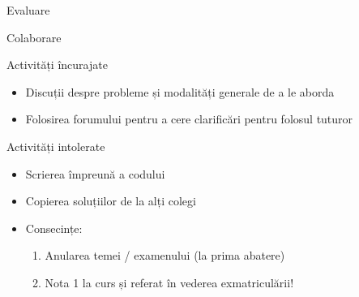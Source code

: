 \documentclass[xcolor=pdftex,romanian,colorlinks]{beamer}
\begin{document}
\begin{section}{Evaluare}
\begin{frame}{Colaborare}

\begin{block}{Activități încurajate}
\begin{itemize}
\item Discuții despre probleme și modalități generale de a le aborda
\item Folosirea forumului pentru a cere clarificări pentru folosul tuturor
\end{itemize}
\end{block}

\vfill\begin{alertblock}{Activități intolerate}
\begin{itemize}
\item Scrierea împreună a codului
\item Copierea soluțiilor de la alți colegi
\item Consecințe:
\begin{enumerate}
\item Anularea temei / examenului (la prima abatere)
\item Nota 1 la curs și referat în vederea exmatriculării!
\end{enumerate}
\end{itemize}
\end{alertblock}
\end{frame}
\end{section}
\end{document}
